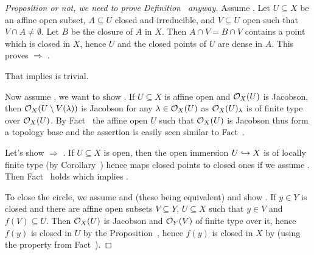\documentclass[a4paper,parskip=half,numbers=enddot, DIV=12]{scrreprt}
\begin{document}
\begin{proof}[Proposition or not, we need to prove Definition~ anyway]
    Assume . Let $U\subseteq X$ be an affine open subset, $A\subseteq U$ closed and irreducible, and $V\subseteq U$ open such that $V\cap A\neq \emptyset$. Let $B$ be the closure of $A$ in $X$. Then $A\cap V = B\cap V$ contains a point which is closed in $X$, hence $U$ and the closed points of $U$ are dense in $A$. This proves  $\Rightarrow $ .
    
    That  implies  is trivial.
    
    Now assume , we want to show . If $U\subseteq X$ is affine open and $\mathcal{O}_X(U)$ is Jacobson, then $\mathcal{O}_X(U\setminus V(\lambda))$ is Jacobson for any $\lambda\in \mathcal{O}_X(U)$ as $\mathcal{O}_X(U)_\lambda$ is of finite type over $\mathcal{O}_X(U)$. By Fact~ the affine open $U$ such that $\mathcal{O}_X(U)$ is Jacobson thus form a topology base and the assertion is easily seen similar to Fact~.
    
    Let's show  $\Rightarrow$ . If $U\subseteq X$ is open, then the open immersion $U\monomorphism X$ is of locally finite type (by Corollary~) hence maps closed points to closed ones if we assume . Then Fact~ holds which implies .
    
    To close the circle, we assume  and  (these being equivalent) and show . If $y\in Y$ is closed and there are affine open subsets $V\subseteq Y$, $U\subseteq X$ such that $y\in V$ and $f(V)\subseteq U$. Then $\mathcal{O}_X(U)$ is Jacobson and $\mathcal{O}_Y(V)$ of finite type over it, hence $f(y)$ is closed in $U$ by the Proposition~, hence $f(y)$ is closed in $X$ by  (using the property from Fact~).
\end{proof}
\end{document}
